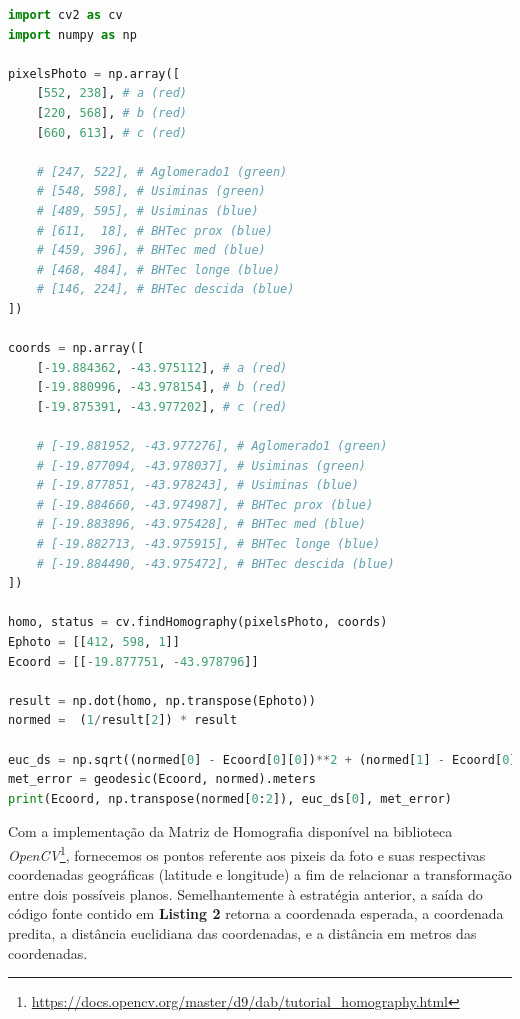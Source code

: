 \documentclass[12pt]{report}
\begin{document}
{\begin{lstlisting}[language=Python, caption=Código-fonte com Homografia implementado para a obtenção de valores aproximados para as coordenadas.]
import cv2 as cv
import numpy as np

pixelsPhoto = np.array([
    [552, 238], # a (red)
    [220, 568], # b (red)
    [660, 613], # c (red)

    # [247, 522], # Aglomerado1 (green)
    # [548, 598], # Usiminas (green)
    # [489, 595], # Usiminas (blue)
    # [611,  18], # BHTec prox (blue)
    # [459, 396], # BHTec med (blue)
    # [468, 484], # BHTec longe (blue)
    # [146, 224], # BHTec descida (blue)
])

coords = np.array([
    [-19.884362, -43.975112], # a (red)
    [-19.880996, -43.978154], # b (red)
    [-19.875391, -43.977202], # c (red)

    # [-19.881952, -43.977276], # Aglomerado1 (green)
    # [-19.877094, -43.978037], # Usiminas (green)
    # [-19.877851, -43.978243], # Usiminas (blue)
    # [-19.884660, -43.974987], # BHTec prox (blue)
    # [-19.883896, -43.975428], # BHTec med (blue)
    # [-19.882713, -43.975915], # BHTec longe (blue)
    # [-19.884490, -43.975472], # BHTec descida (blue)
])

homo, status = cv.findHomography(pixelsPhoto, coords)
Ephoto = [[412, 598, 1]]
Ecoord = [[-19.877751, -43.978796]]

result = np.dot(homo, np.transpose(Ephoto))
normed =  (1/result[2]) * result

euc_ds = np.sqrt((normed[0] - Ecoord[0][0])**2 + (normed[1] - Ecoord[0][1])**2)
met_error = geodesic(Ecoord, normed).meters
print(Ecoord, np.transpose(normed[0:2]), euc_ds[0], met_error)
\end{lstlisting}

Com a implementação da Matriz de Homografia disponível na biblioteca \textit{OpenCV}\footnote{\url{https://docs.opencv.org/master/d9/dab/tutorial_homography.html}}, fornecemos os pontos referente aos pixeis da foto e suas respectivas coordenadas geográficas (latitude e longitude) a fim de relacionar a transformação entre dois possíveis planos.
Semelhantemente à estratégia anterior, a saída do código fonte contido em \textbf{Listing 2} retorna a coordenada esperada, a coordenada predita, a distância euclidiana das coordenadas, e a distância em metros das coordenadas.


}
\end{document}
